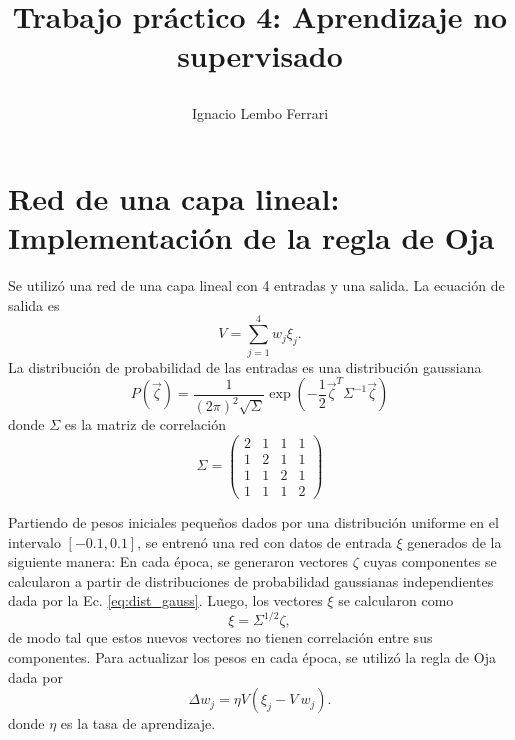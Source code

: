 \documentclass[11pt,twocolumn,twoside]{opticajnl}
\title{
\vspace{0.1cm} 

Trabajo práctico 4: Aprendizaje no supervisado}
\author[1]{\huge{Ignacio Lembo Ferrari}}
\affil[1]{\large{ignaciolembo@ib.edu.ar} 

\vspace{0.1cm}

{\datesfont 31 de octubre del 2023.}

\vspace{0.1cm}
}
\begin{document}
\maketitle

\section{Red de una capa lineal: Implementación de la regla de Oja \label{sec:ej1}}

\vspace{0.3cm}

Se utilizó una red de una capa lineal con 4 entradas y una salida. La ecuación de salida es
\begin{equation}
    V = \sum_{j=1}^{4} w_j \xi_j.
\end{equation}
La distribución de probabilidad de las entradas es una distribución gaussiana
\begin{equation}
    P(\vec{\zeta}) = \frac{1}{(2\pi)^2 \sqrt{\Sigma}} \exp(-\frac{1}{2} \vec{\zeta}^T \Sigma^{-1} \vec{\zeta})
    \label{eq:dist_gauss}
\end{equation}
donde $\Sigma$ es la matriz de correlación 
\begin{equation}
    \Sigma = \begin{pmatrix}
        2 & 1 & 1 & 1 \\ 
        1 & 2 & 1 & 1 \\
        1 & 1 & 2 & 1 \\
        1 & 1 & 1 & 2
    \end{pmatrix}
\end{equation}

Partiendo de pesos iniciales pequeños dados por una distribución uniforme en el intervalo $[-0.1,0.1]$, se entrenó una red con datos de entrada $\xi$ generados de la siguiente manera: En cada época, se generaron vectores $\zeta$ cuyas componentes se calcularon a partir de distribuciones de probabilidad gaussianas independientes dada por la Ec. \ref{eq:dist_gauss}. Luego, los vectores $\xi$ se calcularon como
\begin{equation}
    \xi = \Sigma^{1/2} \zeta,
\end{equation}  
de modo tal que estos nuevos vectores no tienen correlación entre sus componentes. Para actualizar los pesos en cada época, se utilizó la regla de Oja dada por 
\begin{equation}
    \Delta w_{j} = \eta V (\xi_j - V~w_j).
\end{equation}
donde $\eta$ es la tasa de aprendizaje.
\end{document}
